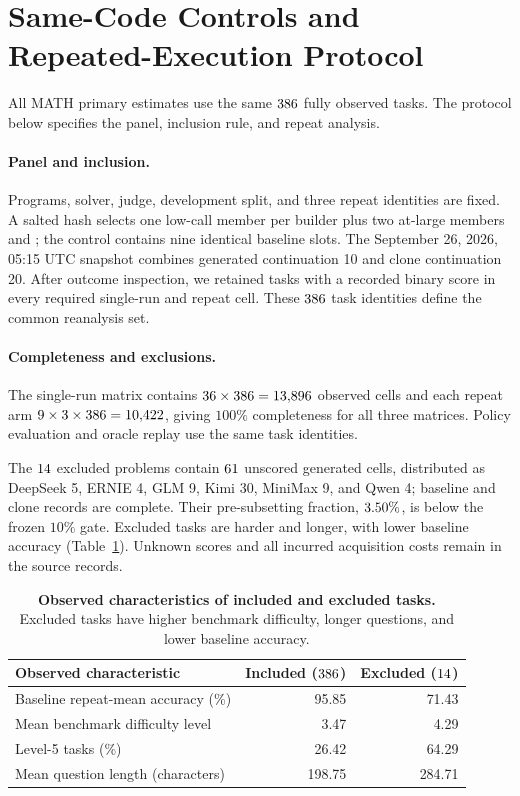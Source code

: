 \section{Same-Code Controls and Repeated-Execution Protocol}\label{app:wp1r}
All MATH primary estimates use the same $386$ fully observed tasks.
The protocol below specifies the panel, inclusion rule, and repeat analysis.

\paragraph{Panel and inclusion.}
Programs, solver, judge, development split, and three repeat identities
are fixed. A salted hash selects one low-call member per builder plus
two at-large members and \bare{}; the control contains nine identical
baseline slots. The September 26, 2026, 05:15 UTC snapshot combines
generated continuation 10 and clone continuation 20. After outcome
inspection, we retained tasks with a recorded binary score in every
required single-run and repeat cell. These $386$ task identities
define the common reanalysis set.

\paragraph{Completeness and exclusions.}
The single-run matrix contains $36\times386=13{,}896$
observed cells and each repeat arm $9\times3\times386=10{,}422$,
giving $100\%$ completeness for all three matrices. Policy evaluation and
oracle replay use the same task identities.

The $14$ excluded problems contain
$61$ unscored generated cells, distributed as
DeepSeek 5, ERNIE 4, GLM 9, Kimi 30, MiniMax 9, and Qwen 4; baseline
and clone records are complete. Their pre-subsetting fraction,
$3.50\%$, is below the frozen $10\%$ gate.
Excluded tasks are harder and longer, with lower baseline accuracy
(Table~\ref{tab:complete-subset}). Unknown scores and all incurred
acquisition costs remain in the source records.

\begin{table}[H]
\centering\small
\begin{tabular}{@{}lrr@{}}
\toprule
Observed characteristic & Included ($386$) & Excluded ($14$) \\
\midrule
Baseline repeat-mean accuracy (\%) & 95.85 & 71.43 \\
Mean benchmark difficulty level & 3.47 & 4.29 \\
Level-5 tasks (\%) & 26.42 & 64.29 \\
Mean question length (characters) & 198.75 & 284.71 \\
\bottomrule
\end{tabular}
\caption{\textbf{Observed characteristics of included and excluded tasks.}
Excluded tasks have higher benchmark difficulty, longer questions, and
lower baseline accuracy.}
\label{tab:complete-subset}
\end{table}


